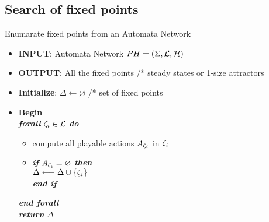 \subsection{Search of fixed points}

\begin{algorithm}[h]
	\caption{Enumarate fixed points from an Automata Network}
	\label{alg:PH-fixpont}
	\begin{itemize}
		\item[] \textbf{INPUT}: Automata Network $PH=(\Sigma,\mathcal{L},\mathcal{H})$
		\item[] \textbf{OUTPUT}: All the fixed points /* steady states or 1-size attractors
		\item[] \textbf{Initialize}: $\Delta \longleftarrow \varnothing$ /*  set of fixed points
		\item[] \textbf{Begin} \\
		
			\hspace{0.2cm}	\textbf{\textit{forall}} $\zeta_i \in \mathcal{L}$ \textbf{\textit{do}} 
				
				\begin{itemize}
					\item[] compute all playable actions $A_{\zeta_i}$ in $\zeta_i$
					
					\item[] \textbf{\textit{if}} $A_{\zeta_i} = \varnothing$ \textbf{\textit{then}} \\
						\hspace{0.5cm}  $\Delta \longleftarrow \Delta \cup \{\zeta_i\}$ \\
					 \textbf{\textit{end if}} 
				\end{itemize}		
			\hspace{0.2cm} \textbf{\textit{end forall}} \\		
			\hspace{0.2cm} \textbf{\textit{return}} $\Delta$		
	\end{itemize}
\end{algorithm}

